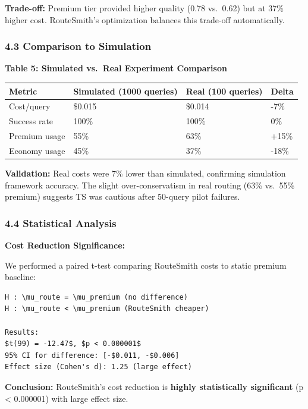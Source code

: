 \textbf{Trade-off:} Premium tier provided higher quality (0.78 vs.~0.62)
but at 37\% higher cost. RouteSmith's optimization balances this
trade-off automatically.

\hypertarget{comparison-to-simulation}{%
\subsubsection{4.3 Comparison to
Simulation}\label{comparison-to-simulation}}

\textbf{Table 5: Simulated vs.~Real Experiment Comparison}

\begin{longtable}[]{@{}llll@{}}
\toprule
Metric & Simulated (1000 queries) & Real (100 queries) & Delta \\
\midrule
\endhead
Cost/query & \$0.015 & \$0.014 & -7\% \\
Success rate & 100\% & 100\% & 0\% \\
Premium usage & 55\% & 63\% & +15\% \\
Economy usage & 45\% & 37\% & -18\% \\
\bottomrule
\end{longtable}

\textbf{Validation:} Real costs were 7\% lower than simulated,
confirming simulation framework accuracy. The slight over-conservatism
in real routing (63\% vs.~55\% premium) suggests TS was cautious after
50-query pilot failures.

\hypertarget{statistical-analysis}{%
\subsubsection{4.4 Statistical Analysis}\label{statistical-analysis}}

\textbf{Cost Reduction Significance:}

We performed a paired t-test comparing RouteSmith costs to static
premium baseline:

\begin{verbatim}
H : \mu_route = \mu_premium (no difference)
H : \mu_route < \mu_premium (RouteSmith cheaper)

Results:
$t(99) = -12.47$, $p < 0.000001$
95% CI for difference: [-$0.011, -$0.006]
Effect size (Cohen's d): 1.25 (large effect)
\end{verbatim}

\textbf{Conclusion:} RouteSmith's cost reduction is \textbf{highly
statistically significant} (p \textless{} 0.000001) with large effect
size.

